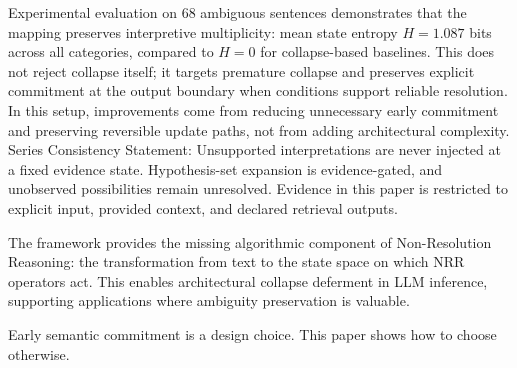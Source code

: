 \documentclass[11pt,a4paper]{article}
\begin{document}
Experimental evaluation on 68 ambiguous sentences demonstrates that the mapping 
preserves interpretive multiplicity: mean state entropy $H = 1.087$ bits across 
all categories, compared to $H = 0$ for collapse-based baselines.
This does not reject collapse itself; it targets premature collapse and preserves explicit commitment at the output boundary when conditions support reliable resolution.
In this setup, improvements come from reducing unnecessary early commitment and preserving reversible update paths, not from adding architectural complexity.
Series Consistency Statement: Unsupported interpretations are never injected at a fixed evidence state. Hypothesis-set expansion is evidence-gated, and unobserved possibilities remain unresolved. Evidence in this paper is restricted to explicit input, provided context, and declared retrieval outputs.

The framework provides the missing algorithmic component of Non-Resolution Reasoning: 
the transformation from text to the state space on which NRR operators act. This 
enables architectural collapse deferment in LLM inference, supporting applications 
where ambiguity preservation is valuable.

Early semantic commitment is a design choice. This paper shows how to choose otherwise.
\end{document}
